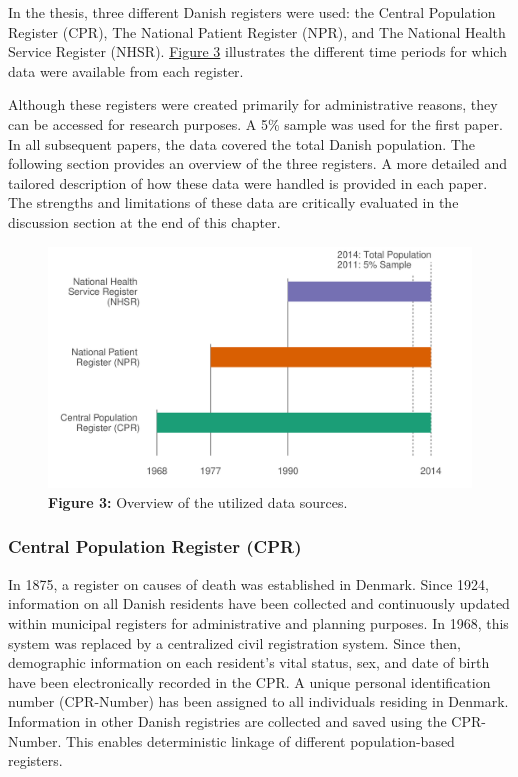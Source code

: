 In the thesis, three different Danish registers were used: the Central 
Population Register (CPR), The National Patient Register (NPR), and 
The National Health Service Register (NHSR). \hyperref[ch1:fig3]{Figure 3} 
illustrates the different time periods for which data were available from 
each register.

Although these registers were created primarily for administrative 
reasons, they can be accessed for research purposes.\citep{andersen1999,
schmidt2014,thygesen2014entire} A 5\% sample was used for the first paper. 
In all subsequent papers, the data covered the total Danish population. 
The following section provides an overview of the three registers. A 
more detailed and tailored description of how these data were handled 
is provided in each paper. The strengths and limitations of these data 
are critically evaluated in the discussion section at the end of this 
chapter. \\


	\begin{figure}[H]
		\centering
		\includegraphics[scale=0.425]{Summary/PLOT/DATA/PLOT_DATA.pdf}
		\caption*{\textbf{Figure 3:} Overview of the utilized data sources.}
	\label{ch1:fig3} 
	\end{figure}
	
	
\subsubsection*{Central Population Register (CPR)}
In 1875, a register on causes of death was established in Denmark.\citep{thygesen2011} 
Since 1924, information on all Danish residents have been collected and 
continuously updated within municipal registers for administrative and 
planning purposes.\citep{malig1996civil} In 1968, this system was replaced 
by a centralized civil registration system.\citep{pedersen2006} Since then, 
demographic information on each resident's vital status, sex, and date of 
birth have been electronically recorded in the CPR. A unique personal 
identification number (CPR-Number) has been assigned to all individuals 
residing in Denmark.\citep{pedersen2011} Information in other Danish 
registries are collected and saved using the CPR-Number. This enables 
deterministic linkage of different population-based registers.\\

